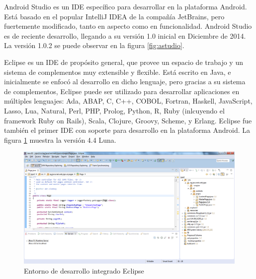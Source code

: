 Android Studio es un \ac{IDE} específico para desarrollar en la plataforma Android. Está basado en el popular IntelliJ IDEA de la compañía JetBrains, pero fuertemente modificado, tanto en aspecto como en funcionalidad. Android Studio es de reciente desarrollo, llegando a su versión 1.0 inicial en Diciembre de 2014. La versión 1.0.2 se puede observar en la figura \ref{fig:astudio}.

Eclipse es un \ac{IDE} de propósito general, que provee un espacio de trabajo y un sistema de complementos muy extensible y flexible. Está escrito en Java, e inicialmente se enfocó al desarrollo en dicho lenguaje, pero gracias a su sistema de complementos, Eclipse puede ser utilizado para desarrollar aplicaciones en múltiples lenguajes: Ada, ABAP, C, C++, COBOL, Fortran, Haskell, JavaScript, Lasso, Lua, Natural, Perl, PHP, Prolog, Python, R, Ruby (inlcuyendo el framework Ruby on Rails), Scala, Clojure, Groovy, Scheme, y Erlang. Eclipse fue también el primer \ac{IDE} con soporte para desarrollo en la plataforma Android. La figura \ref{fig:eclipse} muestra la versión 4.4 Luna.
 
 \begin{figure}[h] \centering
    \includegraphics[width=12cm]{graphs/eclipse.png} \caption{Entorno de desarrollo integrado Eclipse}\label{fig:eclipse}
\end{figure}
 
